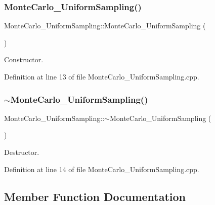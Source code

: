 \subsubsection{\texorpdfstring{Monte\+Carlo\+\_\+\+Uniform\+Sampling()}{MonteCarlo\_UniformSampling()}}
{\footnotesize\ttfamily Monte\+Carlo\+\_\+\+Uniform\+Sampling\+::\+Monte\+Carlo\+\_\+\+Uniform\+Sampling (\begin{DoxyParamCaption}{ }\end{DoxyParamCaption})}



Constructor. 



Definition at line 13 of file Monte\+Carlo\+\_\+\+Uniform\+Sampling.\+cpp.

\mbox{\label{class_monte_carlo___uniform_sampling_a1ccdb02604ffeb1f334b55ec24584f0c}} 
\subsubsection{\texorpdfstring{$\sim$\+Monte\+Carlo\+\_\+\+Uniform\+Sampling()}{~MonteCarlo\_UniformSampling()}}
{\footnotesize\ttfamily Monte\+Carlo\+\_\+\+Uniform\+Sampling\+::$\sim$\+Monte\+Carlo\+\_\+\+Uniform\+Sampling (\begin{DoxyParamCaption}{ }\end{DoxyParamCaption})}



Destructor. 



Definition at line 14 of file Monte\+Carlo\+\_\+\+Uniform\+Sampling.\+cpp.



\subsection{Member Function Documentation}
\mbox{\label{class_monte_carlo___uniform_sampling_a1920387a9f817c8179531fa02f7c00d3}} 
